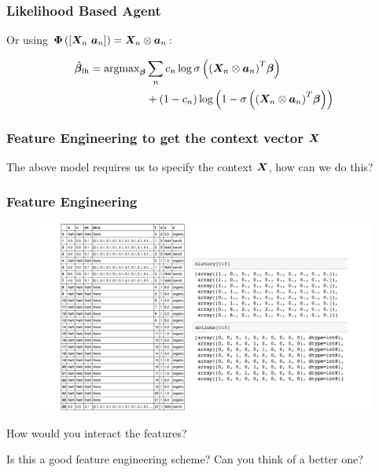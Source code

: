 \begin{frame}
  \frametitle{Likelihood Based Agent}

Or using $\bm{\Phi} \left( \left[ {\bm{X}}_n ~ {\bm{a}}_n \right] \right) = {\bm{X}}_n \otimes {\bm{a}}_n$:

\begin{align*}
	\hat{\bm{\beta}}_{\rm lh} = {\rm argmax}_{\bm{\beta}}
	& \sum_n c_n \log \sigma
				\left(
					{
						\left(
							{\bm{X}}_n \otimes {\bm{a}}_n
						\right)
					}^T \bm{\beta}
				\right) \\
	& + \left(
		1-c_n
	  \right)
	  \log
	  \left(
	  	1 - \sigma
			\left(
				{
					\left(
						{\bm{X}}_n \otimes {\bm{a}}_n
					\right)
				}^T \bm{\beta}
			\right)
	\right)
  \end{align*}
\end{frame}


\begin{frame}
  \frametitle{Feature Engineering to get the context vector $\bm{X}$}

  The above model requires us to specify the context $\bm{X}$, how can we do this?
\end{frame}



\begin{frame}
  \frametitle{Feature Engineering}
\begin{figure}[h!]
\includegraphics[scale=0.3]{images/feature_engineering.png}
\centering
\end{figure}

\pause
How would you interact the features?

\pause
Is this a good feature engineering scheme?  Can you think of a better one?
\end{frame}


